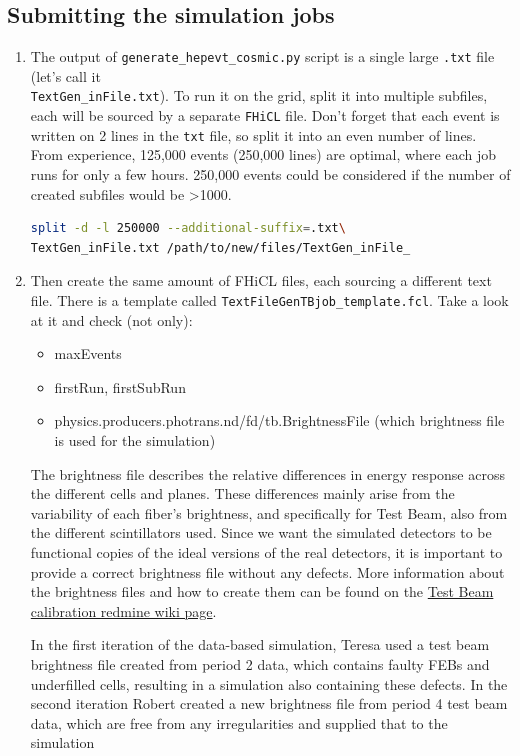 \documentclass[12pt]{article}
\begin{document}
\subsection{Submitting the simulation jobs}\label{secGenerator}
\begin{enumerate}
\item The output of \texttt{generate\_hepevt\_cosmic.py} script is a single large \texttt{.txt} file (let's call it \\ \texttt{TextGen\_inFile.txt}). To run it on the grid, split it into multiple subfiles, each will be sourced by a separate \texttt{FHiCL} file. Don't forget that each event is written on 2 lines in the \texttt{txt} file, so split it into an even number of lines. From experience, 125,000 events (250,000 lines) are optimal, where each job runs for only a few hours. 250,000 events could be considered if the number of created subfiles would be >1000.
\begin{lstlisting}[frame=single,language=bash]
split -d -l 250000 --additional-suffix=.txt\
TextGen_inFile.txt /path/to/new/files/TextGen_inFile_
\end{lstlisting}

\item Then create the same amount of FHiCL files, each sourcing a different text file. There is a template called \texttt{TextFileGenTBjob\_template.fcl}. Take a look at it and check (not only):
\begin{itemize}
\item maxEvents
\item firstRun, firstSubRun
\item physics.producers.photrans.nd/fd/tb.BrightnessFile (which brightness file is used for the simulation)
\end{itemize}

The brightness file describes the relative differences in energy response across the different cells and planes. These differences mainly arise from the variability of each fiber's brightness, and specifically for Test Beam, also from the different scintillators used. Since we want the simulated detectors to be functional copies of the ideal versions of the real detectors, it is important to provide a correct brightness file without any defects. More information about the brightness files and how to create them can be found on the \href{https://cdcvs.fnal.gov/redmine/projects/novaart/wiki/Test\_Beam\_Calibration\_Instructions}{Test Beam calibration redmine wiki page}.

In the first iteration of the data-based simulation, Teresa used a test beam brightness file created from period 2 data, which contains faulty FEBs and underfilled cells, resulting in a simulation also containing these defects. In the second iteration Robert created a new brightness file from period 4 test beam data, which are free from any irregularities and supplied that to the simulation


\end{enumerate}
\end{document}
